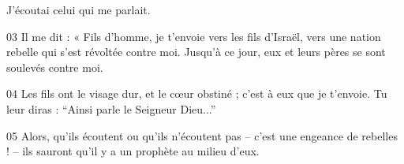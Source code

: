 J’écoutai celui qui me parlait.

03 Il me dit : « Fils d’homme, je t’envoie vers les fils d’Israël, vers une nation rebelle qui s’est révoltée contre moi. Jusqu’à ce jour, eux et leurs pères se sont soulevés contre moi.

04 Les fils ont le visage dur, et le cœur obstiné ; c’est à eux que je t’envoie. Tu leur diras : “Ainsi parle le Seigneur Dieu...”

05 Alors, qu’ils écoutent ou qu’ils n’écoutent pas – c’est une engeance de rebelles ! – ils sauront qu’il y a un prophète au milieu d’eux.
